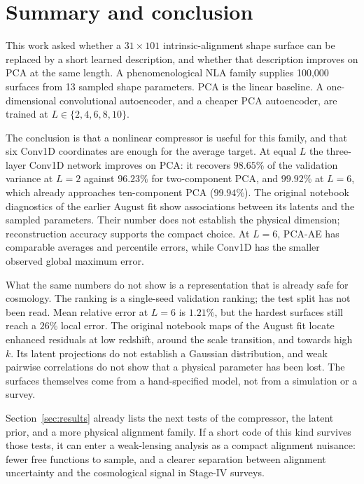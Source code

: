 \clearpage
\section{Summary and conclusion}
\label{sec:summary}

This work asked whether a $31\times101$ intrinsic-alignment shape surface
can be replaced by a short learned description, and whether that
description improves on PCA at the same length.  A phenomenological NLA
family supplies 100,000 surfaces from 13 sampled shape parameters.  PCA
is the linear baseline.  A one-dimensional convolutional autoencoder,
and a cheaper PCA autoencoder, are trained at
$L\in\{2,4,6,8,10\}$.

The conclusion is that a nonlinear compressor is useful for this family,
and that six Conv1D coordinates are enough for the average target.  At
equal $L$ the three-layer Conv1D network improves on PCA:
it recovers $98.65\%$ of the validation variance at $L=2$ against
$96.23\%$ for two-component PCA, and $99.92\%$ at $L=6$, which already
approaches ten-component PCA ($99.94\%$). The original notebook
diagnostics of the earlier August fit show associations between its
latents and the sampled parameters. Their number does not establish
the physical dimension; reconstruction accuracy supports the compact
choice. At $L=6$, PCA-AE has comparable averages and percentile errors,
while Conv1D has the smaller observed global maximum error.

What the same numbers do not show is a representation that is already
safe for cosmology.  The ranking is a single-seed validation ranking;
the test split has not been read.  Mean relative error at $L=6$ is
$1.21\%$, but the hardest surfaces still reach a $26\%$ local error.
The original notebook maps of the August fit locate enhanced residuals
at low redshift, around the scale transition, and towards high $k$.
Its latent projections do not establish a Gaussian distribution,
and weak pairwise correlations do not show that a physical parameter
has been lost. The surfaces
themselves come from a hand-specified model, not from a simulation or
a survey.

Section~\ref{sec:results} already lists the next tests of the
compressor, the latent prior, and a more physical alignment family.
If a short code of this kind survives those tests, it can enter a
weak-lensing analysis as a compact alignment nuisance: fewer free
functions to sample, and a clearer separation between alignment
uncertainty and the cosmological signal in Stage-IV surveys.
